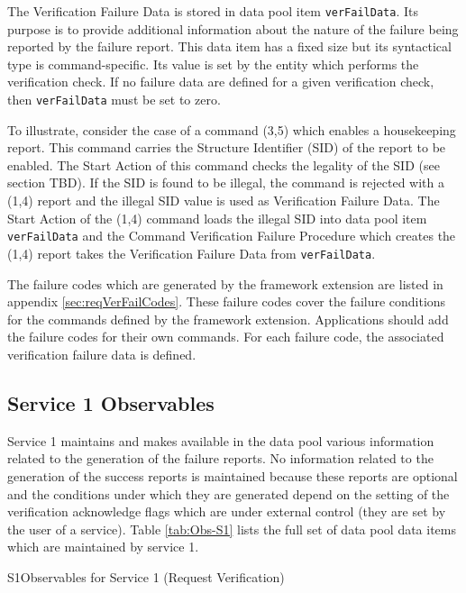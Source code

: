 \documentclass[a4paper,10pt]{article}
\newenvironment{cr_obs}[2]
{
\begin{longtable}{|l|p{9.5cm}|}
\caption{#2}\label{tab:Obs-#1} \\
\hline
\rowcolor{light-gray}
\textbf{Name} & \textbf{Description}\\
\hline\hline
\endfirsthead
\rowcolor{light-gray}
\textbf{Name} & \textbf{Description}\\
\hline\hline
\endhead
\DTLforeach*[\DTLiseq{\cat}{#1}]{dbObs}{\cat=Category,\name=Name,\desc=Desc}
{\DTLiffirstrow{}{\\\hline}\texttt{\name} & \desc}\\\hline
}
{\end{longtable}}
\begin{document}
The Verification Failure Data is stored in data pool item \texttt{verFailData}. Its purpose is to provide additional information about the nature of the failure being reported by the failure report. This data item has a fixed size but its syntactical type is command-specific. Its value is set by the entity which performs the verification check. If no failure data are defined for a given verification check, then \texttt{verFailData} must be set to zero. 

To illustrate, consider the case of a command (3,5) which enables a housekeeping report. This command carries the Structure Identifier (SID) of the report to be enabled. The Start Action of this command checks the legality of the SID (see section TBD). If the SID is found to be illegal, the command is rejected with a (1,4) report and the illegal SID value is used as Verification Failure Data. The Start Action of the (1,4) command loads the illegal SID into data pool item \texttt{verFailData} and the Command Verification Failure Procedure which creates the (1,4) report takes the Verification Failure Data from \texttt{verFailData}.

The failure codes which are generated by the framework extension are listed in appendix \ref{sec:reqVerFailCodes}. These failure codes cover the failure conditions for the commands defined by the framework extension. Applications should add the failure codes for their own commands. For each failure code, the associated verification failure data is defined.

\subsection{Service 1 Observables}\label{sec:serv1Obs}
Service 1 maintains and makes available in the data pool various information related to the generation of the failure reports. No information related to the generation of the success reports is maintained because these reports are optional and the conditions under which they are generated depend on the setting of the verification acknowledge flags which are under external control (they are set by the user of a service). Table \ref{tab:Obs-S1} lists the full set of data pool data items which are maintained by service 1.

\begin{cr_obs}{S1}{Observables for Service 1 (Request Verification)}
\end{cr_obs}
\end{document}
